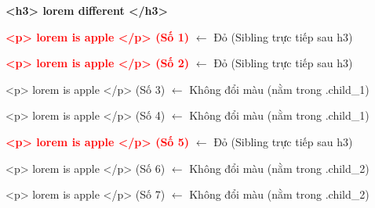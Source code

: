 \documentclass[11pt,oneside]{book}
\begin{document}
\begin{browserWindow}
\sffamily\small
\begin{tcolorbox}[arc=2pt, colback=primaryBlue!5, colframe=primaryBlue!40, boxrule=1pt, title={\sffamily\small\color{white}\textbf{.Parent}}, colbacktitle=primaryBlue!70]
{\bfseries\large\textcolor{darkText}{<h3> lorem different </h3>}} \par\vspace{4pt}
\textcolor{red}{\textbf{<p> lorem is apple </p> (Số 1)}} {\small\textcolor{gray!60}{$\leftarrow$ Đỏ (Sibling trực tiếp sau h3)}} \par\vspace{2pt}
\textcolor{red}{\textbf{<p> lorem is apple </p> (Số 2)}} {\small\textcolor{gray!60}{$\leftarrow$ Đỏ (Sibling trực tiếp sau h3)}} \par\vspace{3pt}
\begin{tcolorbox}[arc=2pt, colback=white, colframe=gray!30, boxrule=1pt, title={\sffamily\scriptsize\color{darkText}.child\_1}]
\textcolor{darkText}{<p> lorem is apple </p> (Số 3)} {\small\textcolor{gray!60}{$\leftarrow$ Không đổi màu (nằm trong .child\_1)}} \par\vspace{2pt}
\textcolor{darkText}{<p> lorem is apple </p> (Số 4)} {\small\textcolor{gray!60}{$\leftarrow$ Không đổi màu (nằm trong .child\_1)}}
\end{tcolorbox}\vspace{3pt}
\textcolor{red}{\textbf{<p> lorem is apple </p> (Số 5)}} {\small\textcolor{gray!60}{$\leftarrow$ Đỏ (Sibling trực tiếp sau h3)}} \par\vspace{3pt}
\begin{tcolorbox}[arc=2pt, colback=white, colframe=gray!30, boxrule=1pt, title={\sffamily\scriptsize\color{darkText}.child\_2}]
\textcolor{darkText}{<p> lorem is apple </p> (Số 6)} {\small\textcolor{gray!60}{$\leftarrow$ Không đổi màu (nằm trong .child\_2)}} \par\vspace{2pt}
\textcolor{darkText}{<p> lorem is apple </p> (Số 7)} {\small\textcolor{gray!60}{$\leftarrow$ Không đổi màu (nằm trong .child\_2)}}
\end{tcolorbox}
\end{tcolorbox}
\end{browserWindow}
\end{document}
